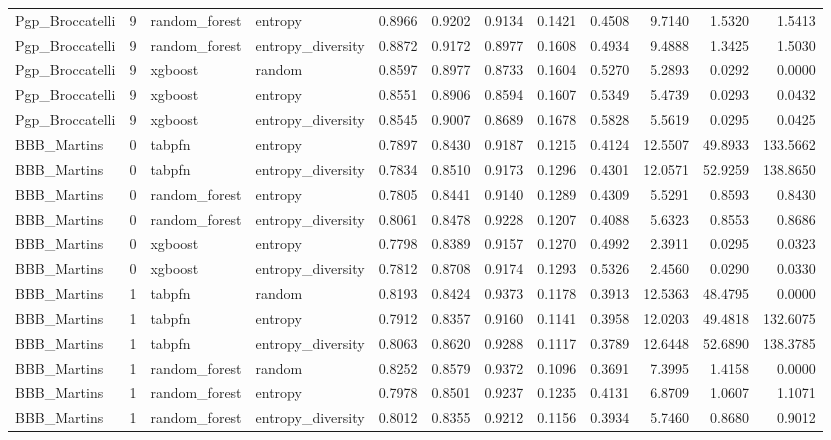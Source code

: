 \begin{tabular}{lrllrrrrrrrr}
Pgp_Broccatelli & 9 & random_forest & entropy & 0.8966 & 0.9202 & 0.9134 & 0.1421 & 0.4508 & 9.7140 & 1.5320 & 1.5413 \\
Pgp_Broccatelli & 9 & random_forest & entropy_diversity & 0.8872 & 0.9172 & 0.8977 & 0.1608 & 0.4934 & 9.4888 & 1.3425 & 1.5030 \\
Pgp_Broccatelli & 9 & xgboost & random & 0.8597 & 0.8977 & 0.8733 & 0.1604 & 0.5270 & 5.2893 & 0.0292 & 0.0000 \\
Pgp_Broccatelli & 9 & xgboost & entropy & 0.8551 & 0.8906 & 0.8594 & 0.1607 & 0.5349 & 5.4739 & 0.0293 & 0.0432 \\
Pgp_Broccatelli & 9 & xgboost & entropy_diversity & 0.8545 & 0.9007 & 0.8689 & 0.1678 & 0.5828 & 5.5619 & 0.0295 & 0.0425 \\
BBB_Martins & 0 & tabpfn & entropy & 0.7897 & 0.8430 & 0.9187 & 0.1215 & 0.4124 & 12.5507 & 49.8933 & 133.5662 \\
BBB_Martins & 0 & tabpfn & entropy_diversity & 0.7834 & 0.8510 & 0.9173 & 0.1296 & 0.4301 & 12.0571 & 52.9259 & 138.8650 \\
BBB_Martins & 0 & random_forest & entropy & 0.7805 & 0.8441 & 0.9140 & 0.1289 & 0.4309 & 5.5291 & 0.8593 & 0.8430 \\
BBB_Martins & 0 & random_forest & entropy_diversity & 0.8061 & 0.8478 & 0.9228 & 0.1207 & 0.4088 & 5.6323 & 0.8553 & 0.8686 \\
BBB_Martins & 0 & xgboost & entropy & 0.7798 & 0.8389 & 0.9157 & 0.1270 & 0.4992 & 2.3911 & 0.0295 & 0.0323 \\
BBB_Martins & 0 & xgboost & entropy_diversity & 0.7812 & 0.8708 & 0.9174 & 0.1293 & 0.5326 & 2.4560 & 0.0290 & 0.0330 \\
BBB_Martins & 1 & tabpfn & random & 0.8193 & 0.8424 & 0.9373 & 0.1178 & 0.3913 & 12.5363 & 48.4795 & 0.0000 \\
BBB_Martins & 1 & tabpfn & entropy & 0.7912 & 0.8357 & 0.9160 & 0.1141 & 0.3958 & 12.0203 & 49.4818 & 132.6075 \\
BBB_Martins & 1 & tabpfn & entropy_diversity & 0.8063 & 0.8620 & 0.9288 & 0.1117 & 0.3789 & 12.6448 & 52.6890 & 138.3785 \\
BBB_Martins & 1 & random_forest & random & 0.8252 & 0.8579 & 0.9372 & 0.1096 & 0.3691 & 7.3995 & 1.4158 & 0.0000 \\
BBB_Martins & 1 & random_forest & entropy & 0.7978 & 0.8501 & 0.9237 & 0.1235 & 0.4131 & 6.8709 & 1.0607 & 1.1071 \\
BBB_Martins & 1 & random_forest & entropy_diversity & 0.8012 & 0.8355 & 0.9212 & 0.1156 & 0.3934 & 5.7460 & 0.8680 & 0.9012 \\

\end{tabular}
